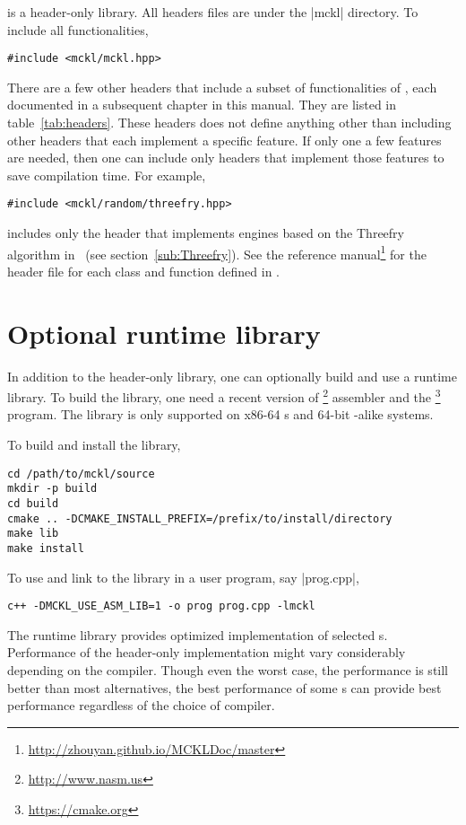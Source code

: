 \mckl is a header-only library. All headers files are under the |mckl|
directory. To include all functionalities,
\begin{verbatim}
#include <mckl/mckl.hpp>
\end{verbatim}
There are a few other headers that include a subset of functionalities of
\mckl, each documented in a subsequent chapter in this manual. They are listed
in table~\ref{tab:headers}. These headers does not define anything other than
including other headers that each implement a specific feature. If only one a
few features are needed, then one can include only headers that implement those
features to save compilation time. For example,
\begin{verbatim}
#include <mckl/random/threefry.hpp>
\end{verbatim}
includes only the header that implements \rng engines based on the Threefry
algorithm in~\cite{Salmon:2011um} (see section~\ref{sub:Threefry}). See the
reference manual\footnote{\url{http://zhouyan.github.io/MCKLDoc/master}} for
the header file for each class and function defined in \mckl.

\section{Optional runtime library}
\label{sec:Optional runtime library}

In addition to the header-only library, one can optionally build and use a
runtime library. To build the library, one need a recent version of
\nasm\footnote{\url{http://www.nasm.us}} assembler and the
\cmake\footnote{\url{https://cmake.org}} program. The library is only supported
on x86-64 \cpu{}s and 64-bit \unix-alike systems.

To build and install the library,
\begin{verbatim}
cd /path/to/mckl/source
mkdir -p build
cd build
cmake .. -DCMAKE_INSTALL_PREFIX=/prefix/to/install/directory
make lib
make install
\end{verbatim}
To use and link to the library in a user program, say |prog.cpp|,
\begin{verbatim}
c++ -DMCKL_USE_ASM_LIB=1 -o prog prog.cpp -lmckl
\end{verbatim}

The runtime library provides optimized implementation of selected \rng{}s.
Performance of the header-only implementation might vary considerably depending
on the compiler. Though even the worst case, the performance is still better
than most alternatives, the best performance of some \rng{}s can provide best
performance regardless of the choice of compiler.

